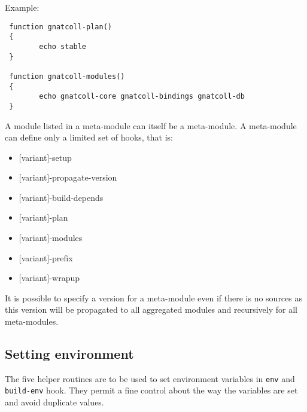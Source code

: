 \documentclass[a4paper,12pt,twoside]{article}
\newcommand{\code}[1]{\texttt{#1}}
\begin{document}
Example:

\begin{lstlisting}
 function gnatcoll-plan()
 {
		echo stable
 }

 function gnatcoll-modules()
 {
		echo gnatcoll-core gnatcoll-bindings gnatcoll-db
 }
\end{lstlisting}

A module listed in a meta-module can itself be a meta-module. A meta-module can define only a limited set of hooks, that is:

\begin{itemize}[font=\texttt]
	\item {[variant]-setup}
	\item {[variant]-propagate-version}
	\item {[variant]-build-depends}
	\item {[variant]-plan}
	\item {[variant]-modules}
	\item {[variant]-prefix}
	\item {[variant]-wrapup}
\end{itemize}

It is possible to specify a version for a meta-module even if there is no sources as this version will be propagated to all aggregated modules and recursively for all meta-modules.

\subsection{Setting environment}
\label{set-env}

The five helper routines are to be used to set environment variables in \code{env} and \code{build-env} hook. They permit a fine control about the way the variables are set and avoid duplicate values.
\end{document}
